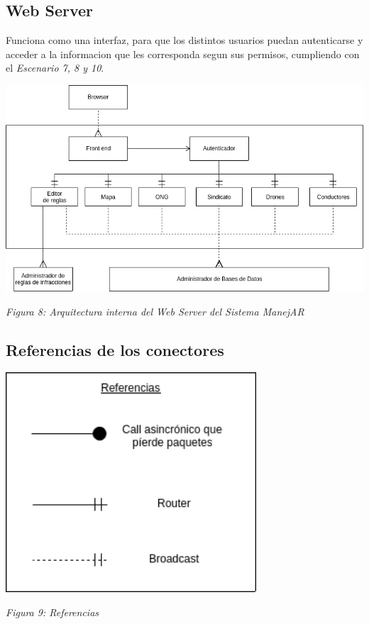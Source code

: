 \subsection{Web Server}
Funciona como una interfaz, para que los distintos usuarios puedan autenticarse 
y acceder a la informacion que les corresponda segun sus permisos, cumpliendo 
con el \textit{Escenario 7, 8 y 10}.



\centerline{\includegraphics[width=1\textwidth]{./imagenes/arquitectura_tp2/web_server.png}}
\centerline{\textit{Figura 8: Arquitectura interna del Web Server del Sistema ManejAR}}


\subsection{Referencias de los conectores}



\centerline{\includegraphics[width=0.7\textwidth]{./imagenes/arquitectura_tp2/referencias.png}} 
\centerline{\textit{Figura 9: Referencias}}